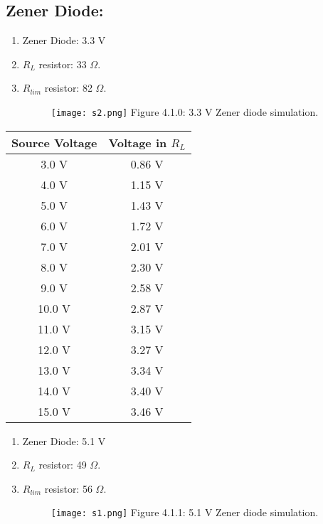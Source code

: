 \subsection{Zener Diode:}

\begin{multicols}{2}
\begin{tasks}
\begin{enumerate}
\item Zener Diode: 3.3 V
\item $R_{L}$ resistor: 33 $\Omega$.
\item $R_{lim}$ resistor: 82 $\Omega$.
\begin{figure}[H]
\texttt{[image: s2.png]}
\centering \linebreak \linebreak Figure 4.1.0: 3.3 V Zener diode simulation.
\end{figure}
\end{enumerate}

\begin{center}
\begin{tabular}[.5cm]{ c c }
\toprule
Source Voltage & Voltage in $R_{L}$ \\
\midrule
3.0 V & 0.86 V \\
\cmidrule{1-2}
4.0 V & 1.15 V \\
\cmidrule{1-2}
5.0 V & 1.43 V \\
\cmidrule{1-2}
6.0 V & 1.72 V \\
\cmidrule{1-2}
7.0 V & 2.01 V \\
\cmidrule{1-2}
8.0 V & 2.30 V \\
\cmidrule{1-2}
9.0 V & 2.58 V \\
\cmidrule{1-2}
10.0 V & 2.87 V \\
\cmidrule{1-2}
11.0 V & 3.15 V \\
\cmidrule{1-2}
12.0 V & 3.27 V \\
\cmidrule{1-2}
13.0 V & 3.34 V \\
\cmidrule{1-2}
14.0 V & 3.40 V \\
\cmidrule{1-2}
15.0 V & 3.46 V \\
\bottomrule
\end{tabular}
\end{center} 

\begin{enumerate}
\item Zener Diode: 5.1 V
\item $R_{L}$ resistor: 49 $\Omega$.
\item $R_{lim}$ resistor: 56 $\Omega$.
\begin{figure}[H]
\texttt{[image: s1.png]}
\centering \linebreak \linebreak Figure 4.1.1: 5.1 V Zener diode simulation.
\end{figure}
\end{enumerate}


\end{tasks}
\end{multicols}
